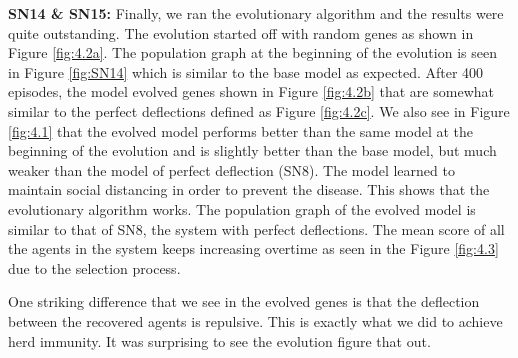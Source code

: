 \documentclass[a4paper,11pt]{article}
\begin{document}
    \textbf{SN14  \& SN15:} Finally, we ran the evolutionary algorithm and the results were quite outstanding.
    The evolution started off with random genes as shown in Figure \ref{fig:4.2a}.
    The population graph at the beginning of the evolution is seen in Figure \ref{fig:SN14} which is similar to the base model as expected.
    After 400 episodes, the model evolved genes shown in Figure \ref{fig:4.2b} that are somewhat similar to the perfect deflections defined as Figure \ref{fig:4.2c}.
    We also see in Figure \ref{fig:4.1} that the evolved model performs better than the same model at the beginning of the evolution and is slightly better than the base model, but much weaker than the model of perfect deflection (SN8).
    The model learned to maintain social distancing in order to prevent the disease.
    This shows that the evolutionary algorithm works.
    The population graph of the evolved model is similar to that of SN8, the system with perfect deflections.
    The mean score of all the agents in the system keeps increasing overtime as seen in the Figure \ref{fig:4.3} due to the selection process.

    One striking difference that we see in the evolved genes is that the deflection between the recovered agents is repulsive.
    This is exactly what we did to achieve herd immunity.
    It was surprising to see the evolution figure that out.
\end{document}
